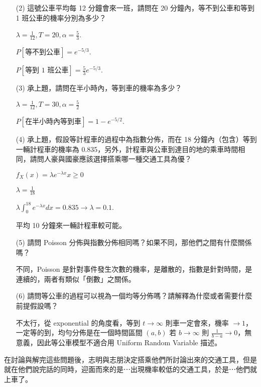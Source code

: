 \documentclass{article}
\begin{document}
\begin{enumerate}
\begin{enumerate}
        \item [(2)] 這號公車平均每 12 分鐘會來一班，請問在 20 分鐘內，等不到公車和等到 1 班公車的機率分別為多少？

        $\lambda = \frac{1}{12}, T = 20, \alpha = \frac{5}{3}$.

        $P[\text{等不到公車}] = e^{-5 / 3}$.

        $P[\text{等到 1 班公車}] = \frac{5}{3} e^{-5 / 3}$.

        \item [(3)] 承上題，請問在半小時內，等到車的機率為多少？

        $\lambda = \frac{1}{12}, T = 30, \alpha = \frac{5}{2}$

        $P[\text{在半小時內等到車}] = 1 - e^{-5 / 2}$.

        \item [(4)] 承上題，假設等計程車的過程中為指數分佈，而在 18 分鐘內（包含）等到一輛計程車的機率為 0.835，另外，計程車與公車到達目的地的乘車時間相同，請問人豪與國豪應該選擇搭乘哪一種交通工具為優？

        $f_X(x) = \lambda e^{-\lambda x} x \ge 0$

        $\lambda = \frac{1}{18}$

        $\lambda \int_0^{18} e^{-\lambda x} dx = 0.835 \to \lambda = 0.1$.

        平均 10 分鐘來一輛計程車較可能。

        \item [(5)] 請問 Poisson 分佈與指數分佈相同嗎？如果不同，那他們之間有什麼關係嗎？

        不同，Poisson 是針對事件發生次數的機率，是離散的，指數是針對時間，是連續的，兩者有類似「倒數」之關係。

        \item [(6)] 請問等公車的過程可以視為一個均等分佈嗎？請解釋為什麼或者需要什麼前提假設嗎？ 

        不太行，從 exponential 的角度看，等到 $t \to \infty$ 則車一定會來，機率 $\to 1$，一定等的到，均勻分佈是在一個時間區間 $(a, b)$ 若 $b \to \infty$ 則 $\frac{1}{b - a} \to 0$，無意義，因此等公車模型不適合用 Uniform Random Variable 描述。

    \end{enumerate}

    在討論與解完這些問題後，志明與志朋決定搭乘他們所討論出來的交通工具，但是就在他們說完話的同時，迎面而來的是⋯出現機率較低的交通工具，於是⋯他們就上車了。 


\end{enumerate}
\end{document}
